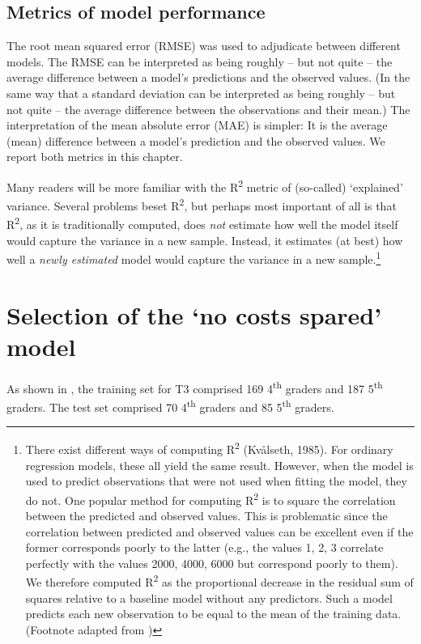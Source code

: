 \documentclass[output=paper]{langsci/langscibook}
\begin{document}
\subsection{Metrics of model performance}

The root mean squared error (RMSE) was used to adjudicate between different models. The RMSE can be interpreted as being roughly – but not quite – the average difference between a model’s predictions and the observed values. (In the same way that a standard deviation can be interpreted as being roughly – but not quite – the average difference between the observations and their mean.) The interpretation of the mean absolute error (MAE) is simpler: It is the average (mean) difference between a model’s prediction and the observed values. We report both metrics in this chapter.

Many readers will be more familiar with the R\textsuperscript{2} metric of (so-called) ‘explained’ variance. Several problems beset R\textsuperscript{2}, but perhaps most important of all is that R\textsuperscript{2}, as it is traditionally computed, does \textit{not} estimate how well the model itself would capture the variance in a new sample. Instead, it estimates (at best) how well a \textit{newly estimated} model would capture the variance in a new sample.\footnote{There exist different ways of computing R\textsuperscript{2} (Kvålseth, 1985). For ordinary regression models, these all yield the same result. However, when the model is used to predict observations that were not used when fitting the model, they do not. One popular method for computing R\textsuperscript{2} is to square the correlation between the predicted and observed values. This is problematic since the correlation between predicted and observed values can be excellent even if the former corresponds poorly to the latter (e.g., the values 1, 2, 3 correlate perfectly with the values 2000, 4000, 6000 but correspond poorly to them). We therefore computed R\textsuperscript{2} as the proportional decrease in the residual sum of squares relative to a baseline model without any predictors. Such a model predicts each new observation to be equal to the mean of the training data. (Footnote adapted from \citealt{VanhoveEtAl2019})}

\section{Selection of the ‘no costs spared’ model}

As shown in , the training set for T3 comprised 169 4\textsuperscript{th} graders and 187 5\textsuperscript{th} graders. The test set comprised 70 4\textsuperscript{th} graders and 85 5\textsuperscript{th} graders.
\end{document}

